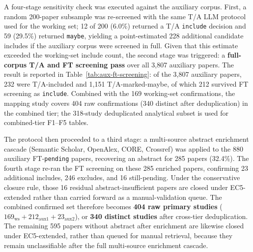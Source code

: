 A four-stage sensitivity check was executed against the auxiliary corpus.
First, a random 200-paper subsample was re-screened with the same T/A LLM
protocol used for the working set;
12 of 200 (6.0\%) returned a T/A
\texttt{include} decision and 59 (29.5\%) returned \texttt{maybe}, yielding
a point-estimated 228 additional candidate includes if the auxiliary corpus
were screened in full. Given that this estimate exceeded the working-set
include count, the second stage was triggered: a \textbf{full-corpus
T/A and FT screening pass} over all 3{,}807 auxiliary papers.
The result is reported in
Table~\ref{tab:aux-ft-screening}: of the 3{,}807 auxiliary papers, 232
were T/A-included and 1{,}151 T/A-marked-maybe, of which 212 survived FT
screening as \texttt{include}. Combined with the 169 working-set
confirmations, the mapping study covers 404 raw confirmations (340 distinct
after deduplication) in the combined tier; the 318-study deduplicated
analytical subset is used for combined-tier F1--F5 tables.

The protocol then proceeded to a third stage: a multi-source abstract
enrichment cascade (Semantic Scholar, OpenAlex, CORE, Crossref) was applied
to the 880 auxiliary FT-\texttt{pending} papers,
recovering an abstract for 285 papers
(32.4\%). The fourth stage re-ran the FT screening on these 285 enriched
papers, confirming 23 additional includes,
246 excludes, and 16 still-pending. Under the conservative closure rule,
those 16 residual abstract-insufficient papers are closed under EC5-extended
rather than carried forward as a manual-validation queue. The combined
confirmed set therefore becomes \textbf{404 raw primary studies}
($169_{\text{ws}} + 212_{\text{aux1}} + 23_{\text{aux2}}$), or
\textbf{340 distinct studies} after cross-tier deduplication. The remaining
595 papers without abstract after enrichment are likewise closed under
EC5-extended, rather than queued for manual retrieval, because they remain
unclassifiable after the full multi-source enrichment cascade.







